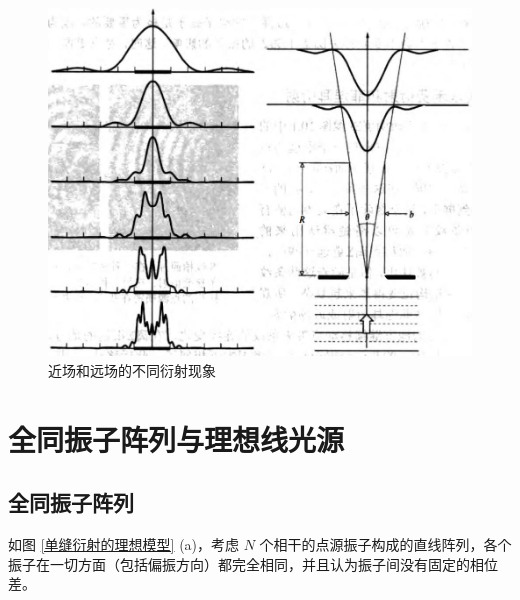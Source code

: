 \documentclass[UTF8]{report}
\theoremstyle{MyLineTheoremStyle} %
\theoremstyle{MyBlockTheoremStyle} %
\theoremstyle{MySubsubsectionStyle} %
\begin{document}
\begin{figure}[H]\centering
    \includegraphics[width = 0.6\columnwidth]{assets/4/4.1 衍射发生的条件.jpg}
    \caption{近场和远场的不同衍射现象}\label{近场和远场的不同衍射现象}
\end{figure}

\section{全同振子阵列与理想线光源}

\subsection{全同振子阵列}
如图 \ref{单缝衍射的理想模型} (a)，考虑 $N$ 个相干的点源振子构成的直线阵列，各个振子在一切方面（包括偏振方向）都完全相同，并且认为振子间没有固定的相位差。
\end{document}
